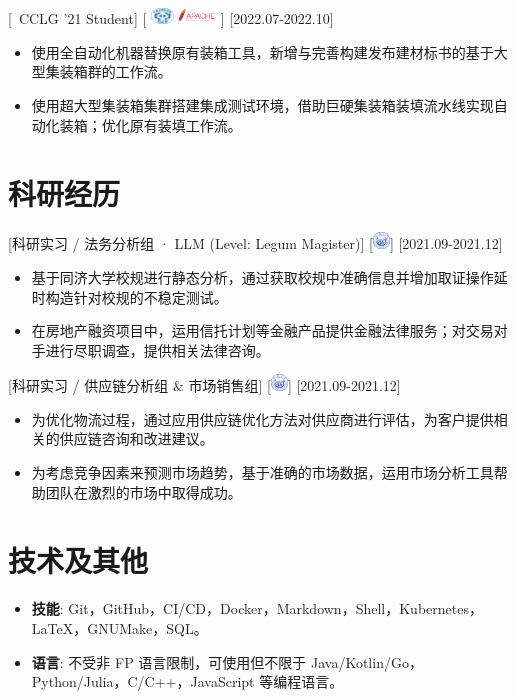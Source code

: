 \documentclass{resume}
\begin{document}
[\ CCLG '21 Student]
[
  \includegraphics[width=0.6cm]{figure/China_Computer_Federation_logo.png}
  \includegraphics[width=1cm]{figure/ASF_Logo.svg.png}
]
[2022.07-2022.10]
\begin{itemize}
  \item 使用全自动化机器替换原有装箱工具，新增与完善构建发布建材标书的基于大型集装箱群的工作流。
  \item 使用超大型集装箱集群搭建集成测试环境，借助巨硬集装箱装填流水线实现自动化装箱；优化原有装填工作流。
\end{itemize}


\section{科研经历}

[科研实习 / 法务分析组 · LLM (Level: Legum Magister)]
[\includegraphics[width=0.45cm]{figure/Tongji_Uni_logo.svg.png}]
[2021.09-2021.12]
\begin{itemize}
  \item 基于同济大学校规进行静态分析，通过获取校规中准确信息并增加取证操作延时构造针对校规的不稳定测试。
  \item 在房地产融资项目中，运用信托计划等金融产品提供金融法律服务；对交易对手进行尽职调查，提供相关法律咨询。
\end{itemize}

[科研实习 / 供应链分析组 \& 市场销售组]
[\includegraphics[width=0.45cm]{figure/Tongji_Uni_logo.svg.png}]
[2021.09-2021.12]
\begin{itemize}
  \item 为优化物流过程，通过应用供应链优化方法对供应商进行评估，为客户提供相关的供应链咨询和改进建议。
  \item 为考虑竞争因素来预测市场趋势，基于准确的市场数据，运用市场分析工具帮助团队在激烈的市场中取得成功。
\end{itemize}


\section[技术及其他]{技术及其他}
\begin{itemize}
  \item \textbf{技能}: Git，GitHub，CI/CD，Docker，Markdown，Shell，Kubernetes，LaTeX，GNUMake，SQL。
  \item \textbf{语言}: 不受非 FP 语言限制，可使用但不限于 Java/Kotlin/Go，Python/Julia，C/C++，JavaScript 等编程语言。
\end{itemize}
\end{document}
